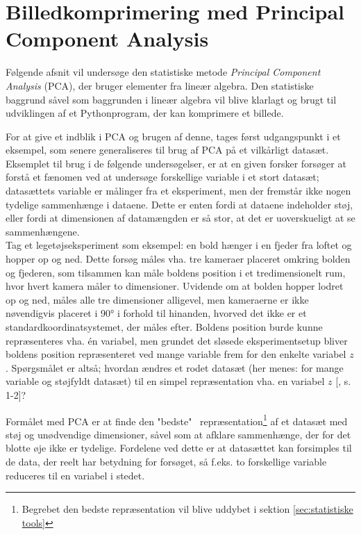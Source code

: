 \chapter{Billedkomprimering med Principal Component Analysis}
Følgende afsnit vil undersøge den statistiske metode \emph{Principal Component Analysis} (PCA), der bruger elementer fra lineær algebra. Den statistiske baggrund såvel som baggrunden i lineær algebra vil blive klarlagt og brugt til udviklingen af et Pythonprogram, der kan komprimere et billede.

For at give et indblik i PCA og brugen af denne, tages først udgangspunkt i et eksempel, som senere generaliseres til brug af PCA på et vilkårligt datasæt. Eksemplet til brug i de følgende undersøgelser, er at en given forsker forsøger at forstå et fænomen ved at undersøge forskellige variable i et stort datasæt; datasættets variable er målinger fra et eksperiment, men der fremstår ikke nogen tydelige sammenhænge i dataene. Dette er enten fordi at dataene indeholder støj, eller fordi at dimensionen af datamængden er så stor, at det er uoverskueligt at se sammenhængene. \\
Tag et legetøjseksperiment som eksempel: en bold hænger i en fjeder fra loftet og hopper op og ned. Dette forsøg måles vha. tre kameraer placeret omkring bolden og fjederen, som tilsammen kan måle boldens position i et tredimensionelt rum, hvor hvert kamera måler to dimensioner. Uvidende om at bolden hopper lodret op og ned, måles alle tre dimensioner alligevel, men kameraerne er ikke nøvendigvis placeret i 90° i forhold til hinanden, hvorved det ikke er et standardkoordinatsystemet, der måles efter. Boldens position burde kunne repræsenteres vha. én variabel, men grundet det sløsede eksperimentsetup bliver boldens position repræsenteret ved mange variable frem for den enkelte variabel $z$. Spørgsmålet er altså; hvordan ændres et rodet datasæt (her menes: for mange variable og støjfyldt datasæt) til en simpel repræsentation vha. en variabel $z$ [\citet{PCA_slens}, s. 1-2]?

Formålet med PCA er at finde den "bedste" \ repræsentation\footnote{Begrebet den bedste repræsentation vil blive uddybet i sektion \ref{sec:statistiske tools}} af et datasæt med støj og unødvendige dimensioner, såvel som at afklare sammenhænge, der for det blotte øje ikke er tydelige. Fordelene ved dette er at datasættet kan forsimples til de data, der reelt har betydning for forsøget, så f.eks. to forskellige variable reduceres til en variabel i stedet.

